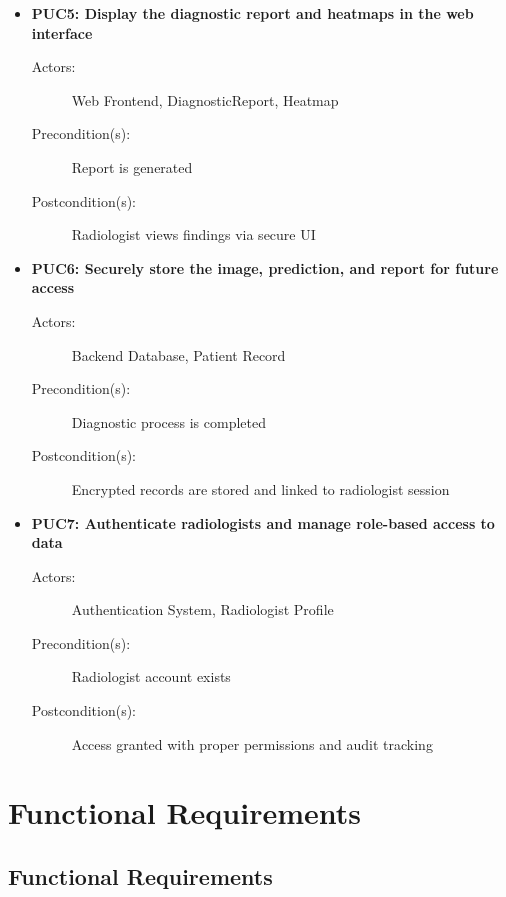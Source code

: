 \documentclass[12pt]{article}
\begin{document}
\begin{itemize}
    \item \textbf{PUC5: Display the diagnostic report and heatmaps in the web interface}
    \begin{description}
        \item[Actors:] Web Frontend, DiagnosticReport, Heatmap
        \item[Precondition(s):] Report is generated
        \item[Postcondition(s):] Radiologist views findings via secure UI
    \end{description}

    \item \textbf{PUC6: Securely store the image, prediction, and report for future access}
    \begin{description}
        \item[Actors:] Backend Database, Patient Record
        \item[Precondition(s):] Diagnostic process is completed
        \item[Postcondition(s):] Encrypted records are stored and linked to radiologist session
    \end{description}

    \item \textbf{PUC7: Authenticate radiologists and manage role-based access to data}
    \begin{description}
        \item[Actors:] Authentication System, Radiologist Profile
        \item[Precondition(s):] Radiologist account exists
        \item[Postcondition(s):] Access granted with proper permissions and audit tracking
    \end{description}
\end{itemize}

\section{Functional Requirements}


\subsection{Functional Requirements}
\end{document}
